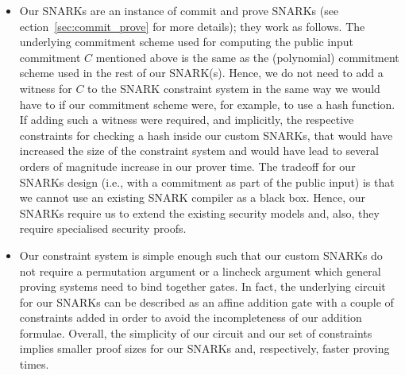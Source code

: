 \begin{itemize}
\item Our SNARKs are an instance of commit and prove SNARKs (see ection~\ref{sec:commit_prove} for more details); they work as follows. 
The underlying commitment scheme used for computing the public input commitment $C$ mentioned above is the 
same as the (polynomial) commitment scheme used in the rest of our SNARK(s). Hence, we do not need to add a witness for $C$ 
to the SNARK constraint system in the same way we would have to if our commitment scheme were, for example, to use a hash function.
If adding such a witness were required, and implicitly, the respective constraints for checking a hash inside our custom SNARKs, 
that would have increased the size of the constraint system and would have lead to several orders of magnitude increase in our prover time. 
The tradeoff for our SNARKs design (i.e., with a commitment as part of the public input) is that we cannot use an existing SNARK compiler as a black box.  
Hence, our SNARKs require us to extend the existing security models and, also, they require specialised security proofs. 

\item Our constraint system is simple enough such that our custom SNARKs do not require a permutation argument or a lincheck argument 
which general proving systems need to bind together gates. In fact, the underlying circuit for our SNARKs can be described as an affine addition 
gate with a couple of constraints added in order to avoid the incompleteness of our addition formulae. Overall, the simplicity of our circuit and our 
set of constraints implies smaller proof sizes for our SNARKs and, respectively, faster proving times.
\end{itemize}

